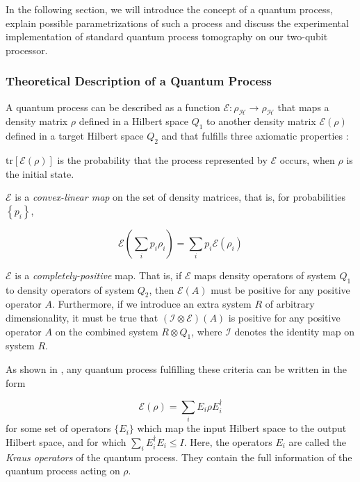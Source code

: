 \smallskip

In the following section, we will introduce the concept of a quantum process, explain possible parametrizations of such a process and discuss the experimental implementation of standard quantum process tomography on our two-qubit processor.

\subsubsection{Theoretical Description of a Quantum Process}

A quantum process can be described as a function $\mathcal{E} : \rho_\mathcal{H} \to \rho_\mathcal{H}$ that maps a density matrix $\rho$ defined in a Hilbert space $Q_1$ to another density matrix $\mathcal{E}(\rho)$ defined in a target Hilbert space $Q_2$ and that fulfills three axiomatic properties \cite{nielsen_quantum_2000,haroche_exploring_2006}:

\begin{axiom}
$\mathrm{tr}\left[\mathcal{E}(\rho)\right]$ is the probability that the process represented by $\mathcal{E}$ occurs, when $\rho$ is the initial state.
\end{axiom}

\begin{axiom}
$\mathcal{E}$ is a {\it convex-linear map} on the set of density matrices, that is, for probabilities $\left\{p_i\right\}$,

  \begin{equation}
	  \mathcal{E}\left(\sum\limits_i p_i \rho_i\right) = \sum\limits_i p_i \mathcal{E}(\rho_i)
	\end{equation}
\end{axiom}

\begin{axiom}
$\mathcal{E}$ is a {\it completely-positive} map. That is, if $\mathcal{E}$  maps density operators of system $Q_1$ to density operators of system $Q_2$, then $\mathcal{E}(A)$ must be positive for any positive operator $A$. Furthermore, if we introduce an extra system $R$ of arbitrary dimensionality, it must be true that $(\mathcal{I}\otimes \mathcal{E})(A)$ is positive for any positive operator $A$ on the combined system $R\otimes Q_1$, where $\mathcal{I}$ denotes the identity map on system $R$.
\end{axiom}
As shown in \cite{nielsen_quantum_2000}, any quantum process fulfilling these criteria can be written in the form

\begin{equation}
  \mathcal{E}(\rho) = \sum\limits_i E_i \rho E_i^\dagger \label{eq:process_operator_sum_representation}
\end{equation}
for some set of operators $\{ E_i \}$ which map the input Hilbert space to the output Hilbert space, and for which $\sum_i E_i^\dagger E_i \le I$. Here, the operators $E_i$ are called the {\it Kraus operators} of the quantum process. They contain the full information of the quantum process acting on $\rho$.

